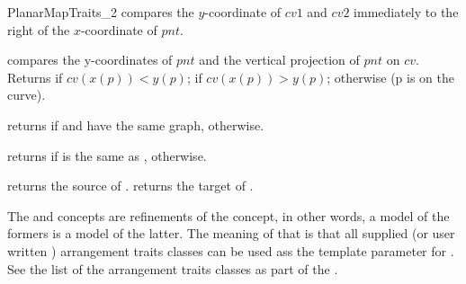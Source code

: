 \begin{ccRefConcept}{PlanarMapTraits_2}
    {compares the $y$-coordinate of $cv1$ and $cv2$ immediately to the right of
     the $x$-coordinate of $pnt$.
     }
    
    {compares the y-coordinates of $pnt$ and the vertical projection of $pnt$
      on $cv$. Returns  if $cv(x(p)) < y(p)$; 
      if $cv(x(p)) > y(p)$;  otherwise (p is on the curve).
    }

    {returns  if  and  have the same graph, 
       otherwise.}

    {returns  if  is the same as , 
      otherwise.}
	  

             {returns the source of .}
             {returns the target of .}


      

\ccHasModels

  The  and
   concepts are refinements of the
   concept, in other words, a model of the
  formers is a model of the latter.  The meaning of that is that all
  supplied (or user written ) arrangement traits classes can be used
  ass the  template parameter for
  .  See the list of the arrangement
  traits classes as part of the .
  
\end{ccRefConcept} %

\ccRefPageEnd















